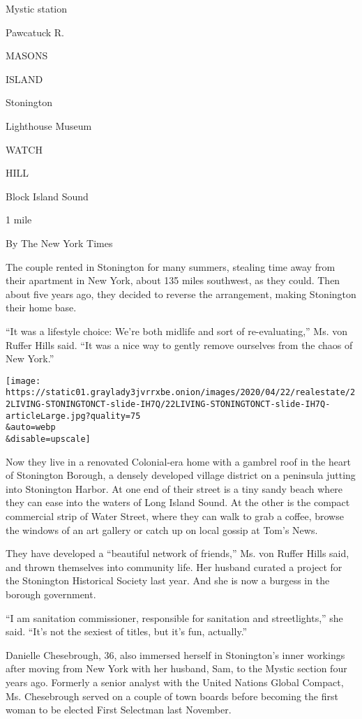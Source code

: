 Mystic station

Pawcatuck R.

MASONS

ISLAND

Stonington

Lighthouse Museum

WATCH

HILL

Block Island Sound

1 mile

By The New York Times

The couple rented in Stonington for many summers, stealing time away
from their apartment in New York, about 135 miles southwest, as they
could. Then about five years ago, they decided to reverse the
arrangement, making Stonington their home base.

``It was a lifestyle choice: We're both midlife and sort of
re-evaluating,'' Ms. von Ruffer Hills said. ``It was a nice way to
gently remove ourselves from the chaos of New York.''

\texttt{[image: https://static01.graylady3jvrrxbe.onion/images/2020/04/22/realestate/22LIVING-STONINGTONCT-slide-IH7Q/22LIVING-STONINGTONCT-slide-IH7Q-articleLarge.jpg?quality=75\\\&auto=webp\\\&disable=upscale]}

Now they live in a renovated Colonial-era home with a gambrel roof in
the heart of Stonington Borough, a densely developed village district on
a peninsula jutting into Stonington Harbor. At one end of their street
is a tiny sandy beach where they can ease into the waters of Long Island
Sound. At the other is the compact commercial strip of Water Street,
where they can walk to grab a coffee, browse the windows of an art
gallery or catch up on local gossip at Tom's News.

They have developed a ``beautiful network of friends,'' Ms. von Ruffer
Hills said, and thrown themselves into community life. Her husband
curated a project for the Stonington Historical Society last year. And
she is now a burgess in the borough government.

``I am sanitation commissioner, responsible for sanitation and
streetlights,'' she said. ``It's not the sexiest of titles, but it's
fun, actually.''

Danielle Chesebrough, 36, also immersed herself in Stonington's inner
workings after moving from New York with her husband, Sam, to the Mystic
section four years ago. Formerly a senior analyst with the United
Nations Global Compact, Ms. Chesebrough served on a couple of town
boards before becoming the first woman to be elected First Selectman
last November.

